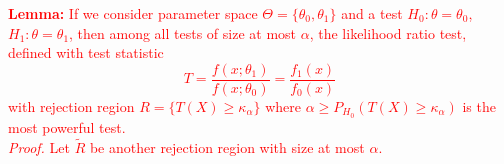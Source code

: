 \documentclass[12pt]{article}
\begin{document}
\begin{enumerate}
\textcolor{red}{
\textbf{Lemma:} If we consider parameter space $\Theta = \{\theta_0, \theta_1\}$ and a test $H_0: \theta = \theta_0$, $H_1 : \theta = \theta_1$, then among all tests of size at most $\alpha$, the likelihood ratio test, defined with test statistic 
\begin{equation*}
    T = \frac{f(x ; \theta_1)}{f(x ; \theta_0)} = \frac{f_1(x)}{f_0(x)}
\end{equation*}
with rejection region $R = \{T(X) \geq \kappa_\alpha\}$ where $\alpha \geq P_{H_0}(T(X) \geq \kappa_\alpha)$ is the most powerful test. \\
\textit{Proof.} Let $\tilde R$ be another rejection region with size at most $\alpha$. 
}

\end{enumerate}
\end{document}
